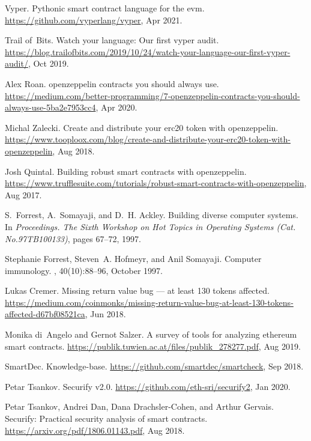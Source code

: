 \begin{thebibliography}{10}
Vyper.
\newblock Pythonic smart contract language for the evm.
\newblock \url{https://github.com/vyperlang/vyper}, Apr 2021.

Trail of~Bits.
\newblock Watch your language: Our first vyper audit.
\newblock
  \url{https://blog.trailofbits.com/2019/10/24/watch-your-language-our-first-vyper-audit/},
  Oct 2019.

Alex Roan.
 openzeppelin contracts you should always use.
\newblock
  \url{https://medium.com/better-programming/7-openzeppelin-contracts-you-should-always-use-5ba2e7953cc4},
  Apr 2020.

Michal Zalecki.
\newblock Create and distribute your erc20 token with openzeppelin.
\newblock
  \url{https://www.tooploox.com/blog/create-and-distribute-your-erc20-token-with-openzeppelin},
  Aug 2018.

Josh Quintal.
\newblock Building robust smart contracts with openzeppelin.
\newblock
  \url{https://www.trufflesuite.com/tutorials/robust-smart-contracts-with-openzeppelin},
  Aug 2017.

S.~{Forrest}, A.~{Somayaji}, and D.~H. {Ackley}.
\newblock Building diverse computer systems.
\newblock In {\em Proceedings. The Sixth Workshop on Hot Topics in Operating
  Systems (Cat. No.97TB100133)}, pages 67--72, 1997.

Stephanie Forrest, Steven~A. Hofmeyr, and Anil Somayaji.
\newblock Computer immunology.
, 40(10):88--96, October 1997.

Lukas Cremer.
\newblock Missing return value bug --- at least 130 tokens affected.
\newblock
  \url{https://medium.com/coinmonks/missing-return-value-bug-at-least-130-tokens-affected-d67bf08521ca},
  Jun 2018.

Monika di~Angelo and Gernot Salzer.
\newblock A survey of tools for analyzing ethereum smart contracts.
\newblock \url{https://publik.tuwien.ac.at/files/publik_278277.pdf}, Aug 2019.

SmartDec.
\newblock Knowledge-base.
\newblock \url{https://github.com/smartdec/smartcheck}, Sep 2018.

Petar Tsankov.
\newblock Securify v2.0.
\newblock \url{https://github.com/eth-sri/securify2}, Jan 2020.

Petar Tsankov, Andrei Dan, Dana Drachsler-Cohen, and Arthur Gervais.
\newblock Securify: Practical security analysis of smart contracts.
\newblock \url{https://arxiv.org/pdf/1806.01143.pdf}, Aug 2018.


\end{thebibliography}

